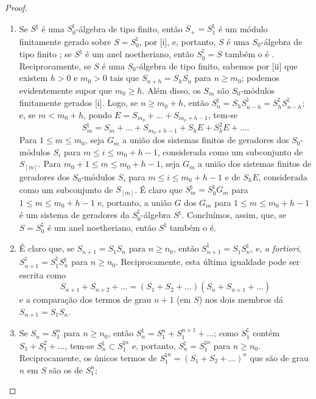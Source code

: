 \documentclass[oneside,10pt]{amsart}
\renewcommand{\leq}{\leqslant}
\renewcommand{\geq}{\geqslant}
\newcommand{\oldpage}[2][]{\marginnote{\normalfont\footnotesize\textbf{#1}~|~#2}\ignorespaces}
\begin{document}
\begin{proof}
\medskip\noindent
\begin{enumerate}
  \item[\rm{(i)}] Se $S^\natural$ é uma $S_0^\natural$-álgebra de tipo finito, então $S_+=S_1^\natural$ é um módulo finitamente gerado sobre $S=S_0^\natural$, por [i], e, portanto, $S$ é uma $S_0$-álgebra de tipo finito ;
    se $S^\natural$ é um anel noetheriano, então $S_0^\natural=S$ também o é .
    Reciprocamente, se $S$ é uma $S_0$-álgebra
\oldpage[II]{160}
    de tipo finito, sabemos por [ii] que existem $h>0$ e $m_0>0$ tais que $S_{n+h}=S_hS_n$ para $n\geq m_0$;
    podemos evidentemente supor que $m_0\geq h$.
    Além disso, os $S_m$ são $S_0$-módulos finitamente gerados [i].
    Logo, se $n\geq m_0+h$, então $S_n^\natural = S_hS_{n-h}^\natural = S_h^\natural S_{n-h}^\natural$;
    e, se $m<m_0+h$, pondo $E = S_{m_0}+\ldots+S_{m_0+h-1}$, tem-se
    \[
      S_m^\natural = S_m + \ldots + S_{m_0+h-1} + S_hE + S_h^2E + \ldots.
    \]
    Para $1\leq m\leq m_0$, seja $G_m$ a união dos sistemas finitos de geradores dos $S_0$-módulos $S_i$ para $m\leq i\leq m_0+h-1$, considerada como um subconjunto de $S_{[m]}$.
    Para $m_0+1\leq m\leq m_0+h-1$, seja $G_m$ a união dos sistemas finitos de geradores dos $S_0$-módulos $S_i$ para $m\leq i\leq m_0+h-1$ e de $S_hE$, considerada como um subconjunto de $S_{[m]}$.
    É claro que $S_m^\natural=S_0^\natural G_m$ para $1\leq m\leq m_0+h-1$ e, portanto, a união $G$ dos $G_m$ para $1\leq m\leq m_0+h-1$ é um sistema de geradores da $S_0^\natural$-álgebra $S^\natural$.
    Concluímos, assim, que, se $S=S_0^\natural$ é um anel noetheriano, então $S^\natural$ também o é.
  \item[\rm{(ii)}] É claro que, se $S_{n+1}=S_1S_n$ para $n\geq n_0$, então $S_{n+1}^\natural=S_1S_n^\natural$, e, \emph{a fortiori}, $S_{n+1}^\natural=S_1^\natural S_n^\natural$ para $n\geq n_0$.
    Reciprocamente, esta última igualdade pode ser escrita como
    \[
      S_{n+1} + S_{n+2} + \ldots
      =
      (S_1 + S_2 + \ldots)(S_n + S_{n+1} + \ldots)
    \]
    e a comparação dos termos de grau $n+1$ (em $S$) nos dois membros dá $S_{n+1}=S_1S_n$.
  \item[\rm{(iii)}] Se $S_n=S_1^n$ para $n\geq n_0$, então $S_n^\natural=S_1^n+S_1^{n+1}+\ldots$;
    como $S_1^\natural$ contém $S_1+S_1^2+\ldots$, tem-se $S_n^\natural\subset S_1^{\natural n}$ e, portanto, $S_n^\natural=S_1^{\natural n}$ para $n\geq n_0$.
    Reciprocamente, os únicos termos de $S_1^{\natural n}=(S_1+S_2+\ldots)^n$ que são de grau $n$ em $S$ são os de $S_1^n$;

\end{enumerate}
\end{proof}
\end{document}
